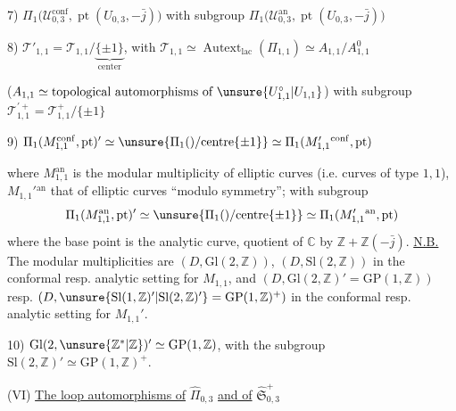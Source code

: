 7) $\Pi_1\bigl(\mathcal U_{0,3}^{\mathrm{conf}},\operatorname{pt}(U_{0,3},-\bar j)\bigr)$
with subgroup $\Pi_1\bigl(\mathcal U_{0,3}^{\mathrm{an}},\operatorname{pt}(U_{0,3},-\bar j)\bigr)$


8) $\mathcal T'_{1,1}=\mathcal T_{1,1}/\underbrace{\{\pm1\}}_{\text{center}}$,
with $\mathcal T_{1,1}\simeq\operatorname{Autext}_{\mathrm{lac}}(\Pi_{1,1})
\simeq A_{1,1}/A_{1,1}^{0}$

($A_{1,1}\simeq\text{topological automorphisms of }\unsure{U_{1,1}^{\circ}|U_{1,1}}$)
with subgroup $\mathcal T_{1,1}^{\prime+}=\mathcal T_{1,1}^{+}/\{\pm1\}$


9) $\Pi_1(M_{1,1}^{\mathrm{conf}},\mathrm{pt})' \simeq \unsure{\Pi_1()/\mathrm{centre}\{\pm1\}} \simeq \Pi_1(M_{1,1}'{}^{\mathrm{conf}},\mathrm{pt})$

where $M_{1,1}^{\mathrm{an}}$ is the  modular multiplicity of  elliptic curves (i.e.  curves of type $1,1$), $M_{1,1}'{}^{\mathrm{an}}$ that of  elliptic curves ``modulo symmetry''; with subgroup
\[
\Pi_1(M_{1,1}^{\mathrm{an}},\mathrm{pt})' \simeq \unsure{\Pi_1()/\mathrm{centre}\{\pm1\}} \simeq \Pi_1(M_{1,1}'{}^{\mathrm{an}},\mathrm{pt})
\]
where the base point is the  analytic curve, quotient of $\mathbb C$ by $\mathbb Z+\mathbb Z(-\bar j)$. \uline{N.B.} The modular multiplicities are $(D,\mathrm{Gl}(2,\mathbb Z))$, $(D,\mathrm{Sl}(2,\mathbb Z))$ in the  conformal resp. analytic setting for $M_{1,1}$, and $(D,\mathrm{Gl}(2,\mathbb Z)'=\mathrm{GP}(1,\mathbb Z))$ resp. $(D,\unsure{\mathrm{Sl}(1,\mathbb Z)'|\mathrm{Sl}(2,\mathbb Z)'}=\mathrm{GP}(1,\mathbb Z)^+)$ in the conformal resp. analytic setting for $M_{1,1}'$.

10) $\mathrm{Gl}(2,\unsure{\mathbb Z^{\ast}|\mathbb Z})' \simeq \mathrm{GP}(1,\mathbb Z)$, with the subgroup $\mathrm{Sl}(2,\mathbb Z)'\simeq\mathrm{GP}(1,\mathbb Z)^+$.


(VI) \uline{The loop automorphisms of} $\widehat{\Pi}_{0,3}$ \uline{and of} $\widehat{\mathfrak S}_{0,3}^{+}$

